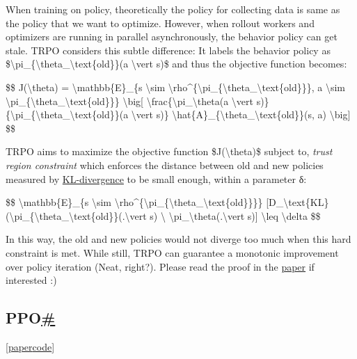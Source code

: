 When training on policy, theoretically the policy for collecting data is same as the policy that we want to optimize. However, when rollout workers and optimizers are running in parallel asynchronously, the behavior policy can get stale. TRPO considers this subtle difference: It labels the behavior policy as \$\textbackslash pi\_\{\textbackslash theta\_\textbackslash text\{old\}\}(a \textbackslash vert s)\$ and thus the objective function becomes:

\$\$ J(\textbackslash theta) = \textbackslash mathbb\{E\}\_\{s \textbackslash sim \textbackslash rho\^{}\{\textbackslash pi\_\{\textbackslash theta\_\textbackslash text\{old\}\}\}, a \textbackslash sim \textbackslash pi\_\{\textbackslash theta\_\textbackslash text\{old\}\}\} \textbackslash big{[} \textbackslash frac\{\textbackslash pi\_\textbackslash theta(a \textbackslash vert s)\}\{\textbackslash pi\_\{\textbackslash theta\_\textbackslash text\{old\}\}(a \textbackslash vert s)\} \textbackslash hat\{A\}\_\{\textbackslash theta\_\textbackslash text\{old\}\}(s, a) \textbackslash big{]} \$\$

TRPO aims to maximize the objective function \$J(\textbackslash theta)\$ subject to, \emph{trust region constraint} which enforces the distance between old and new policies measured by \href{https://en.wikipedia.org/wiki/Kullback\%E2\%80\%93Leibler_divergence}{KL-divergence} to be small enough, within a parameter δ:

\$\$ \textbackslash mathbb\{E\}\_\{s \textbackslash sim \textbackslash rho\^{}\{\textbackslash pi\_\{\textbackslash theta\_\textbackslash text\{old\}\}\}\} {[}D\_\textbackslash text\{KL\}(\textbackslash pi\_\{\textbackslash theta\_\textbackslash text\{old\}\}(.\textbackslash vert s) \textbackslash\textbar{} \textbackslash pi\_\textbackslash theta(.\textbackslash vert s){]} \textbackslash leq \textbackslash delta \$\$

In this way, the old and new policies would not diverge too much when this hard constraint is met. While still, TRPO can guarantee a monotonic improvement over policy iteration (Neat, right?). Please read the proof in the \href{https://arxiv.org/pdf/1502.05477.pdf}{paper} if interested :)

\subsection{\texorpdfstring{PPO\hyperref[ppo]{\#}}{PPO\#}}\label{ppo}

{[}\href{https://arxiv.org/pdf/1707.06347.pdf}{paper}\textbar{}\href{https://github.com/openai/baselines/tree/master/baselines/ppo1}{code}{]}

